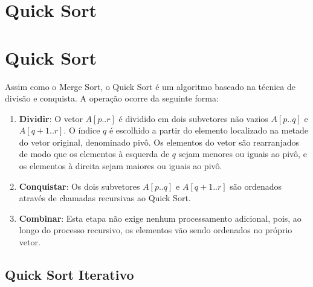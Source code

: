 \section{Quick Sort}
\label{sec:quick-sort-teo}
\section{Quick Sort}
\label{sec:quick-sort-teo}

Assim como o Merge Sort, o Quick Sort é um algoritmo baseado na técnica de divisão e conquista. A operação ocorre da seguinte forma:

\begin{enumerate}
    \item \textbf{Dividir}: O vetor \( A[p..r] \) é dividido em dois subvetores não vazios \( A[p..q] \) e \( A[q+1..r] \). O índice \( q \) é escolhido a partir do elemento localizado na metade do vetor original, denominado pivô. Os elementos do vetor são rearranjados de modo que os elementos à esquerda de \( q \) sejam menores ou iguais ao pivô, e os elementos à direita sejam maiores ou iguais ao pivô.
    
    \item \textbf{Conquistar}: Os dois subvetores \( A[p..q] \) e \( A[q+1..r] \) são ordenados através de chamadas recursivas ao Quick Sort.
    
    \item \textbf{Combinar}: Esta etapa não exige nenhum processamento adicional, pois, ao longo do processo recursivo, os elementos vão sendo ordenados no próprio vetor.
\end{enumerate}

\subsection{Quick Sort Iterativo}

